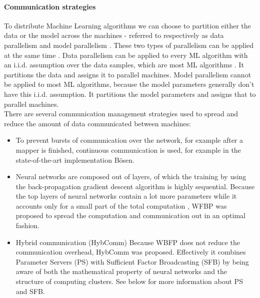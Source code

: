 \paragraph{Communication strategies}
To distribute Machine Learning algorithms we can choose to partition either the data or the model across the machines - referred to respectively as data parallelism and model parallelism \cite{Die12}. These two types of parallelism can be applied at the same time \cite{Xing16}. Data parallelism can be applied to every ML algorithm with an i.i.d. assumption over the data samples, which are most ML algorithms \cite{Xing16}. It partitions the data and assigns it to parallel machines. Model parallelism cannot be applied to most ML algorithms, because the model parameters generally don't have this i.i.d. assumption. It partitions the model parameters and assigns that to parallel machines.\\
There are several communication management strategies\cite{Xing16} used to spread and reduce the amount of data communicated between machines:
\begin{itemize}
	\item To prevent bursts of communication over the network, for example after a mapper is finished, continuous communication is used, for example in the state-of-the-art implementation Bösen\cite{Wei15}.
	
	\item Neural networks are composed out of layers, of which the training by using the back-propagation gradient descent algorithm is highly sequential. Because the top layers of neural networks contain a lot more parameters while it accounts only for a small part of the total computation \cite{Xing16}, WFBP \cite{Zhang17} was proposed to spread the computation and communication out in an optimal fashion.
	
	\item Hybrid communication (HybComm) Because WBFP does not reduce the communication overhead, HybComm \cite{Zhang17} was proposed. Effectively it combines Parameter Servers (PS)\cite{Wei15} with Sufficient Factor Broadcasting (SFB)\cite{Xie15} by being aware of both the mathematical property of neural networks and the structure of computing clusters. See below for more information about PS and SFB.
	
\end{itemize}


